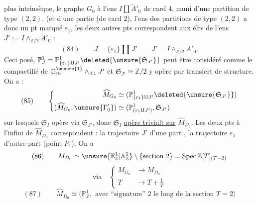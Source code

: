 plus intrinsèque, le graphe $G_0$   à l'ens $I\amalg\widetilde A'_0$ de card $4$, muni d'une partition de type $(2,2)$, (et \unsure{$=$} d'une partie  (de card $2$), l'ens  des  partitions de type $(2,2)$ a donc un pt marqué $\varepsilon_1$, les deux autres pts correspondent aux élts de l'ens $J':=I\wedge_{\mathbb Z/2}\widetilde A'_0$ :
\[
(84)\qquad J=\{\varepsilon_1\}\amalg J'\qquad J'=I\wedge_{\mathbb Z/2}\widetilde A'_0.
\]
Ceci posé, $\mathbb P^1_J=\mathbb P^1_{\{\varepsilon_1\}\amalg J'}\deleted{\unsure{\mathfrak S_{J'}}}$ peut être considéré comme le compactifié de $\mathbb G_m^{\unsure{1}}\wedge_{\pm1}J'$ et  $\mathfrak S_{J'}\simeq\mathbb Z/2$ y opère par transfert de structure. On a :
\[
(85)\qquad
\left\{\begin{aligned}
\widehat M_{G_0}&\simeq(\mathbb P^1_{\{\varepsilon_1\}\amalg J'}\deleted{\unsure{\mathfrak S_{J'}}})\\
(\widehat M_{G_0},\unsure{\Gamma'_0})&\simeq(\mathbb P^1_{(\varepsilon_1\amalg J')},\mathfrak S_{J'})
\end{aligned}\right.
\]
sur lesquels $\mathfrak S_I$ opère via $\mathfrak S_{J'}$, donc $\mathfrak S_I$ \uline{opère trivialt sur} $\widehat M_{D_0}$. Les deux pts à l'infini de $\widehat M_{D_0}$ correspondent : la trajectoire $J'$ d'une part , la trajectoire $\varepsilon_1$ d'autre part (point $P_1$). On a
\[
(86)\qquad M_{D_0}\simeq\unsure{\mathbb E^1_{\mathbb Z}|\mathbb A^1_{\mathbb Z}}\setminus\{\text{section }2\}=\operatorname{Spec}\mathbb Z[T]_{(T-2)}
\]
\[
\text{via}\quad\left\{\begin{aligned}M_{G_0}&\longrightarrow M_{D_0}\\ T&\longrightarrow T+\frac1T\end{aligned}\right.
\]
\[
(87)\qquad\widehat M_{D_0}\simeq\bigl(\mathbb P^1_{\mathbb Z},\text{ avec ``signature'' }2\text{ le long de la section }T=2\bigr)
\]
